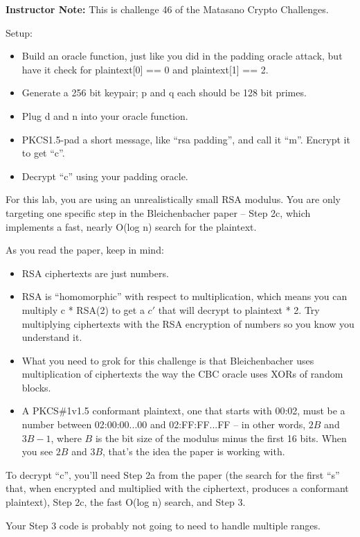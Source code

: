 \documentclass[11pt,oneside]{article}
\begin{document}
\ifinstructornotes
\textbf{Instructor Note:} This is challenge 46 of the Matasano Crypto
Challenges.
\fi

Setup: \begin{itemize}
	\item Build an oracle function, just like you did in the padding oracle attack, but
		have it check for plaintext[0] == 0 and plaintext[1] == 2.
	\item Generate a 256 bit keypair; p and q each should be 128 bit primes.
	\item Plug d and n into your oracle function.
	\item PKCS1.5-pad a short message, like ``rsa padding'', and call it ``m''.
		Encrypt it to get ``c''.
	\item Decrypt ``c'' using your padding oracle.
\end{itemize}

For this lab, you are using an unrealistically small RSA modulus. You are only
targeting one specific step in the Bleichenbacher paper -- Step 2c, which
implements a fast, nearly O(log n) search for the plaintext.

As you read the paper, keep in mind:
\begin{itemize}
	\item RSA ciphertexts are just numbers.
	\item RSA is ``homomorphic'' with respect to multiplication, which means you
		can multiply c * RSA(2) to get a $c'$ that will decrypt to plaintext *
		2. Try multiplying ciphertexts with the RSA encryption of numbers so you
		know you understand it.
	\item What you need to grok for this challenge is that Bleichenbacher uses
		multiplication of ciphertexts the way the CBC oracle uses XORs of random
		blocks.
	\item A PKCS\#1v1.5 conformant plaintext, one that starts with 00:02, must
		be a number between 02:00:00...00 and 02:FF:FF...FF -- in other words,
		$2B$ and $3B-1$, where $B$ is the bit size of the modulus minus the
		first 16 bits. When you see $2B$ and $3B$, that's the idea the paper is
		working with.
\end{itemize}

To decrypt ``c'', you'll need Step 2a from the paper (the search for the first
``s'' that, when encrypted and multiplied with the ciphertext, produces a
conformant plaintext), Step 2c, the fast O(log n) search, and Step 3.

Your Step 3 code is probably not going to need to handle multiple ranges.
\end{document}
